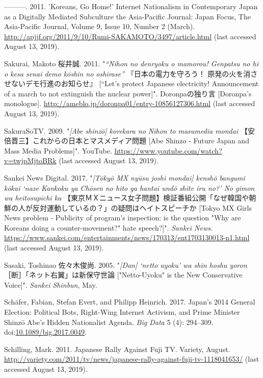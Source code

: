 \documentclass[10pt,british,A4paper,oneside]{memoir}
\begin{document}
\hypertarget{ref-sakamoto_koreans_2011}{}
---------. 2011. 'Koreans, Go Home!' Internet Nationalism in
Contemporary Japan as a Digitally Mediated Subculture the Asia-Pacific
Journal: Japan Focus, The Asia-Pacific Journal, Volume 9, Issue 10,
Number 2 (March).
\url{http://apjjf.org/2011/9/10/Rumi-SAKAMOTO/3497/article.html} (last accessed August 13, 2019).

\hypertarget{ref-sakurai__2011}{}
Sakurai, Makoto 桜井誠. 2011. "\emph{“Nihon no denryoku o mamorou! Genpatsu no hi o kesa senai demo kōshin no oshirase”} 『日本の電力を守ろう！ 原発の火を消させないデモ行進のお知らせ』 [“Let's protect Japanese electricity! Announcement of a march to not extinguish the nuclear power]". Doronpaの独り言 [Doronpa's monologue].
\url{http://ameblo.jp/doronpa01/entry-10856127306.html} (last accessed August 13, 2019).

\hypertarget{ref-sakurasotv_eng._2009}{}
SakuraSoTV. 2009. "\emph{[Abe shinzō] korekara no Nihon to masumedia mondai} 【安倍晋三】これからの日本とマスメディア問題 [Abe Shinzo - Future Japan and Mass Media Problems]". YouTube.
\url{https://www.youtube.com/watch?v=twjpMjtoBRk} (last accessed August 13, 2019).

\hypertarget{ref-sankei_digital_inc_eng._2017}{}
Sankei News Digital. 2017. "\emph{[Tōkyō MX nyūsu joshi mondai] kenshō bangumi kōkai `naze Kankoku ya Chōsen no hito ga hantai undō shite iru no?' No gimon wa heitosupīchi ka} 【東京ＭＸニュース女子問題】検証番組公開「なぜ韓国や朝鮮の人が反対運動しているの？」の疑問はヘイトスピーチか [Tokyo MX Girls News problem - Publicity of program's inspection: is the question "Why are Koreans doing a counter-movement?" hate speech?]". \emph{Sankei News}.
\url{https://www.sankei.com/entertainments/news/170313/ent1703130013-n1.html} (last accessed August 13, 2019).

\hypertarget{ref-sasaki_netto-uyoku_2005}{}
Sasaki, Toshinao 佐々木俊尚. 2005. "\emph{[Dan] `netto uyoku' wa shin hoshu yoron}［断］「ネット右翼」は新保守世論 ["Netto-Uyoku" is the New Conservative Voice]".
\emph{Sankei Shinbun}, May.

\hypertarget{ref-schafer_japans_2017}{}
Schäfer, Fabian, Stefan Evert, and Philipp Heinrich. 2017. Japan's 2014
General Election: Political Bots, Right-Wing Internet Activism, and
Prime Minister Shinzō Abe's Hidden Nationalist Agenda. \emph{Big Data} 5
(4): 294--309.
doi:\href{https://doi.org/10.1089/big.2017.0049}{10.1089/big.2017.0049}.

\hypertarget{ref-schilling_japanese_2011}{}
Schilling, Mark. 2011. Japanese Rally Against Fuji TV. Variety,
August.
\url{http://variety.com/2011/tv/news/japanese-rally-against-fuji-tv-1118041653/} (last accessed August 13, 2019).
\end{document}
